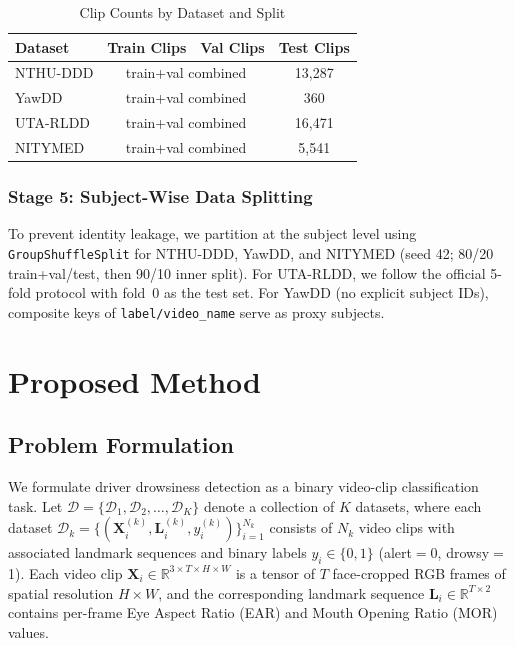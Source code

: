 \documentclass[journal]{IEEEtran}
\begin{document}
\begin{table}[t]
  \caption{Clip Counts by Dataset and Split}
  \label{tab:clip_counts}
  \centering
  \small
  \begin{tabular}{lccc}
    \toprule
    Dataset & Train Clips & Val Clips & Test Clips \\
    \midrule
    NTHU-DDD    & \multicolumn{2}{c}{train+val combined} & 13{,}287 \\
    YawDD       & \multicolumn{2}{c}{train+val combined} & 360 \\
    UTA-RLDD    & \multicolumn{2}{c}{train+val combined} & 16{,}471 \\
    NITYMED     & \multicolumn{2}{c}{train+val combined} & 5{,}541 \\
    \bottomrule
  \end{tabular}
\end{table}

\subsubsection{Stage 5: Subject-Wise Data Splitting}
To prevent identity leakage, we partition at the subject level using \texttt{GroupShuffleSplit} for NTHU-DDD, YawDD, and NITYMED (seed 42; 80/20 train+val/test, then 90/10 inner split). For UTA-RLDD, we follow the official 5-fold protocol with fold~0 as the test set. For YawDD (no explicit subject IDs), composite keys of \texttt{label/video\_name} serve as proxy subjects.

\section{Proposed Method}
\label{sec:method}

\subsection{Problem Formulation}
\label{sec:formulation}

We formulate driver drowsiness detection as a binary video-clip classification task. Let $\mathcal{D} = \{\mathcal{D}_1, \mathcal{D}_2, \ldots, \mathcal{D}_K\}$ denote a collection of $K$ datasets, where each dataset $\mathcal{D}_k = \{(\mathbf{X}_i^{(k)}, \mathbf{L}_i^{(k)}, y_i^{(k)})\}_{i=1}^{N_k}$ consists of $N_k$ video clips with associated landmark sequences and binary labels $y_i \in \{0, 1\}$ (alert$=$0, drowsy$=$1). Each video clip $\mathbf{X}_i \in \mathbb{R}^{3 \times T \times H \times W}$ is a tensor of $T$ face-cropped RGB frames of spatial resolution $H \times W$, and the corresponding landmark sequence $\mathbf{L}_i \in \mathbb{R}^{T \times 2}$ contains per-frame Eye Aspect Ratio (EAR) and Mouth Opening Ratio (MOR) values.
\end{document}
